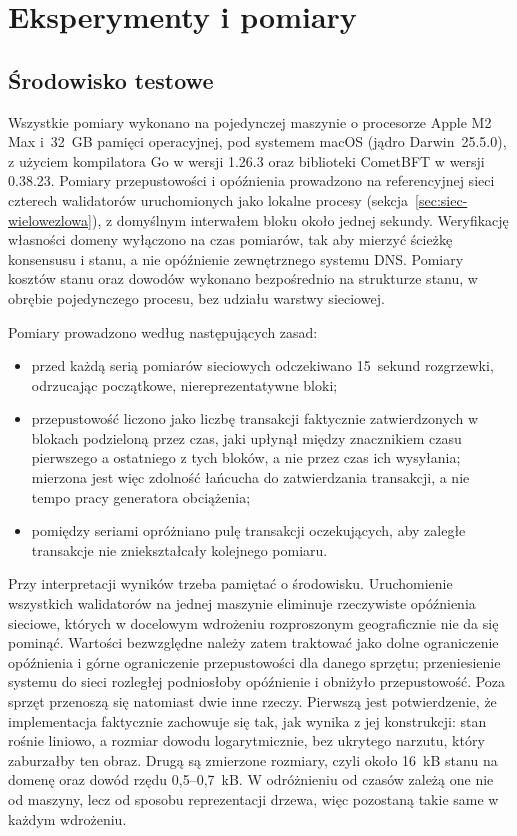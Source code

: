 \chapter{Eksperymenty i pomiary}
\label{ch:eksperymenty}

\section{Środowisko testowe}
\label{sec:srodowisko-testowe}

Wszystkie pomiary wykonano na pojedynczej maszynie o procesorze Apple M2 Max i~32~GB pamięci operacyjnej, pod systemem macOS (jądro Darwin~25.5.0), z użyciem kompilatora Go w wersji 1.26.3 oraz biblioteki CometBFT w wersji 0.38.23. Pomiary przepustowości i opóźnienia prowadzono na referencyjnej sieci czterech walidatorów uruchomionych jako lokalne procesy (sekcja~\ref{sec:siec-wielowezlowa}), z domyślnym interwałem bloku około jednej sekundy. Weryfikację własności domeny wyłączono na czas pomiarów, tak aby mierzyć ścieżkę konsensusu i stanu, a nie opóźnienie zewnętrznego systemu DNS. Pomiary kosztów stanu oraz dowodów wykonano bezpośrednio na strukturze stanu, w obrębie pojedynczego procesu, bez udziału warstwy sieciowej.

Pomiary prowadzono według następujących zasad:
\begin{itemize}
    \item przed każdą serią pomiarów sieciowych odczekiwano 15~sekund rozgrzewki, odrzucając początkowe, niereprezentatywne bloki;
    \item przepustowość liczono jako liczbę transakcji faktycznie zatwierdzonych w blokach podzieloną przez czas, jaki upłynął między znacznikiem czasu pierwszego a ostatniego z tych bloków, a nie przez czas ich wysyłania; mierzona jest więc zdolność łańcucha do zatwierdzania transakcji, a nie tempo pracy generatora obciążenia;
    \item pomiędzy seriami opróżniano pulę transakcji oczekujących, aby zaległe transakcje nie zniekształcały kolejnego pomiaru.
\end{itemize}

Przy interpretacji wyników trzeba pamiętać o środowisku. Uruchomienie wszystkich walidatorów na jednej maszynie eliminuje rzeczywiste opóźnienia sieciowe, których w docelowym wdrożeniu rozproszonym geograficznie nie da się pominąć. Wartości bezwzględne należy zatem traktować jako dolne ograniczenie opóźnienia i górne ograniczenie przepustowości dla danego sprzętu; przeniesienie systemu do sieci rozległej podniosłoby opóźnienie i obniżyło przepustowość. Poza sprzęt przenoszą się natomiast dwie inne rzeczy. Pierwszą jest potwierdzenie, że implementacja faktycznie zachowuje się tak, jak wynika z jej konstrukcji: stan rośnie liniowo, a rozmiar dowodu logarytmicznie, bez ukrytego narzutu, który zaburzałby ten obraz. Drugą są zmierzone rozmiary, czyli około 16~kB stanu na domenę oraz dowód rzędu 0,5--0,7~kB. W odróżnieniu od czasów zależą one nie od maszyny, lecz od sposobu reprezentacji drzewa, więc pozostaną takie same w każdym wdrożeniu.

